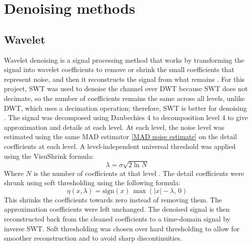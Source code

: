 \documentclass[ %
                    author={Daniel Page},
                supervisor={Dr. Andrew Calway},
                    degree={MSc},
                     title={Some Structural Guidelines for Data Science MSc Theses, Including Those With Long Titles that Run Across Multiple Lines on the Front Page},
                  subtitle={And those including an optional subtitle too, for good measure},
                      type={},
                      year={2021}]{dissertation}
\begin{document}
\section{Denoising methods}

 
\subsection{Wavelet}
Wavelet denoising is a signal processing method that works by transforming the signal into wavelet coefficients to remove or shrink the small coefficients that represent noise, and then it reconstructs the signal from what remains \cite{wei_wavelet_2005}. 
For this project, SWT was used to denoise the channel over DWT because SWT does not decimate, so the number of coefficients remains the same across all levels, unlike DWT, which uses a decimation operation; therefore, SWT is better for denoising \cite{kechris_removing_2021}. 
The signal was decomposed using Daubechies 4 to decomposition level 4 to give approximation and details at each level. At each level, the noise level was estimated using the same MAD estimator \ref{MAD noise estimate} on the detail coefficients at each level. A level-independent universal threshold was applied using the VisuShrink formula:
\begin{equation}
    \lambda = \sigma \sqrt{2 \ln N}
    \label{VisuShrink}
\end{equation}
Where $N$ is the number of coefficients at that level \cite{donoho_minimax_1998}. 
The detail coefficients were shrunk using soft thresholding using the following formula:
\begin{equation}
    \eta(x, \lambda) = \text{sign}(x)\, \max(|x| - \lambda,\, 0)
    \label{Soft thresholding}
\end{equation}
This shrinks the coefficients towards zero instead of removing them. The approximation coefficients were left unchanged. The denoised signal is then reconstructed back from the cleaned coefficients to a time-domain signal by inverse SWT. Soft thresholding was chosen over hard thresholding to allow for smoother reconstruction and to avoid sharp discontinuities\cite{zhang_improved_2019}. 
\end{document}

